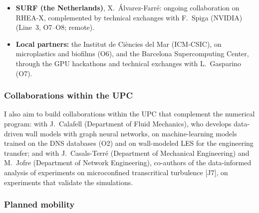 \documentclass[11pt]{article}
\begin{document}
\begin{itemize}
  shear-free flows at high Reynolds numbers~\cite{Silva2018,Alves2025}; single-fluid transcritical
  jets have been simulated~\cite{Lapenna2019,Ream2025}, but their interfaces have not been analyzed,
  although pseudo-boiling changes density, viscosity and diffusivity precisely across them.
  \item \textbf{SURF (the Netherlands)}, X.\ \'Alvarez-Farr\'e: ongoing collaboration on RHEA-X,
  complemented by technical exchanges with F.\ Spiga (NVIDIA) (Line~3, O7--O8; remote).
  \item \textbf{Local partners:} the Institut de Ci\`encies del Mar (ICM-CSIC), on microplastics and
  biofilms (O6), and the Barcelona Supercomputing Center, through the GPU hackathons and technical exchanges with L.\ Gasparino (O7).
\end{itemize}

\subsubsection{Collaborations within the UPC} 

I also aim to build collaborations within the UPC that
complement the numerical program: with J.\ Calafell (Department of Fluid Mechanics), who develops
data-driven wall models with graph neural networks, on machine-learning models trained on the DNS
databases (O2) and on wall-modeled LES for the engineering transfer; and with J.\ Casals-Terr\'e
(Department of Mechanical Engineering) and M.\ Jofre (Department of Network Engineering), co-authors
of the data-informed analysis of experiments on microconfined transcritical turbulence [J7], on
experiments that validate the simulations.

\subsubsection{Planned mobility}
\end{document}
